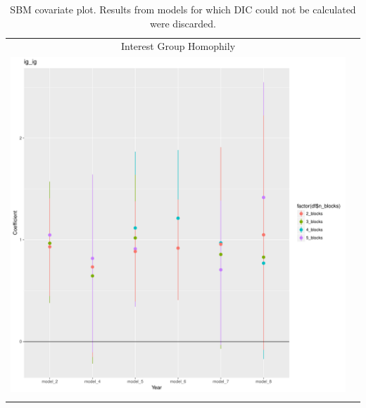 \documentclass[fleqn,12pt]{wlscirep}
\begin{document}
\clearpage
\begin{longtable}[!h]{c@{\hskip 0cm}c}
Interest Group Homophily \\
\includegraphics[height=.75\textheight, clip=true, trim=.5cm .5cm 0cm .6cm]{figures/rl_plots2/ig_ig.pdf}   \\
\caption{\label{fig:SBM_plot_igig} SBM covariate plot. Results from models for which DIC could not be calculated were discarded.}
\end{longtable}
\end{document}
